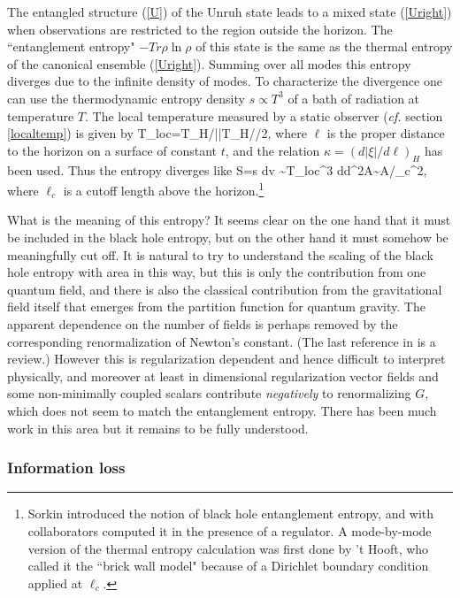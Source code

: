 \documentclass[12pt]{article}
\begin{document}
The entangled structure (\ref{U}) of the 
Unruh state leads to a mixed state (\ref{Uright})
when observations are restricted to the region
outside the horizon. The ``entanglement entropy" 
$-Tr \rho\ln\rho$ of this state is the same as the
thermal entropy of the canonical ensemble (\ref{Uright}). 
Summing over all modes
this entropy diverges due to the infinite density of modes.
To characterize the divergence one can use the thermodynamic
entropy density $s\propto T^3$ of a bath of radiation
at temperature $T$.
The local temperature 
measured by a static observer ({\it cf.} section \ref{localtemp})
is given by  
\beq
T_{loc}=T_H/|\xi|\simeq T_H/\kappa {}/2\pi \ell,
\eeq
where $\ell$ is the proper distance to the horizon on 
a surface of constant $t$, and the relation 
$\kappa = (d|\xi|/d\ell)_H$ has been used. Thus the entropy diverges like
\beq
S=\int s\;  dv \sim \int T_{loc}^3 \; d\ell d^2A\sim A/\ell_c^2,
\eeq
where $\ell_c$ is a cutoff length above the horizon.\footnote{
Sorkin\cite{SorkinGR10} introduced the notion of 
black hole entanglement entropy, and with collaborators\cite{Bombelli:1986rw} 
computed it in the presence of a regulator.  A mode-by-mode
version of the thermal entropy calculation 
was first done by 't Hooft\cite{'tHooft:1984re}, who called it the 
``brick wall model" because of a Dirichlet boundary condition  
applied at $\ell_c$.} 

What is the meaning of this entropy? It seems clear on the
one hand that it must be included in the black hole entropy,
but on the other hand it must somehow be meaningfully cut
off. It is natural to try to understand the scaling of the black hole entropy with area in this way, but this is only the contribution from one quantum field, and there is also the classical contribution from the gravitational field itself that emerges from the partition function for quantum gravity\cite{GHpf}. The apparent dependence on the number of fields is perhaps removed by the corresponding renormalization of Newton's constant\cite{G}. (The last reference in \cite{G} is a review.)
However this is regularization dependent and hence difficult to interpret physically, and moreover at least in dimensional regularization vector fields and some non-minimally coupled scalars
contribute {\it negatively} to renormalizing $G$,
which does not seem to match the entanglement entropy.
There has been much work in this area but it remains
to be fully understood.


\subsubsection{Information loss}
\label{infoloss}
\end{document}
